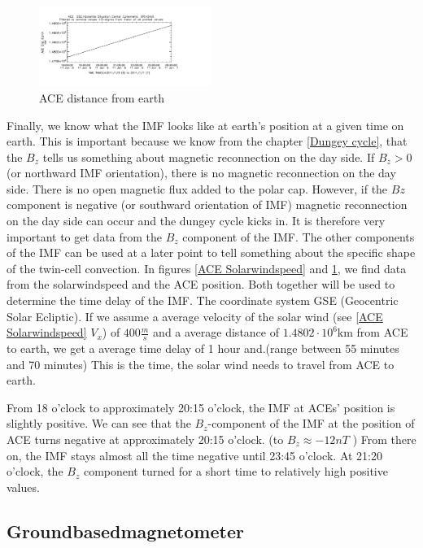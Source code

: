 \documentclass[10pt,a4paper]{article}
\begin{document}
\begin{figure}[h]
\centering
\includegraphics[width=0.5\textwidth]{ACE_distance.pdf}
\caption{ ACE distance from earth \label{ACE distance}}
\end{figure}
Finally, we know what the IMF looks like at earth's position at a given time on earth. 
This is important because we know from the chapter \ref{Dungey cycle}, that the $B_z$ tells us something about magnetic reconnection on the day side. If $B_z>0$ (or northward IMF orientation), there is no magnetic reconnection on the day side. There is no open magnetic flux added to the polar cap. 
However, if the $Bz$ component is negative (or southward orientation of IMF) magnetic reconnection on the day side can occur and the dungey cycle kicks in. 
It is therefore very important to get data from the $B_z$ component of the IMF. The other components of the IMF can be used at a later point to tell something about the specific shape of the twin-cell convection. In figures \ref{ACE Solarwindspeed} and \ref{ACE distance}, we find data from the solarwindspeed and the ACE position. Both together will be used to determine the time delay of the IMF. The coordinate system GSE (Geocentric Solar Ecliptic). If we assume a average velocity of the solar wind (see \ref{ACE Solarwindspeed} $V_x$) of $400 \frac{m}{s}$ and a average distance of $1.4802 \cdot 10^{6} \mathrm{km}$ from ACE to earth, we get a average time delay of 1 hour and.(range between 55 minutes and 70 minutes) This is the time, the solar wind needs to travel from ACE to earth. 

From 18 o'clock to approximately 20:15 o'clock, the IMF at ACEs' position is slightly positive. We can see that the $B_z$-component of the IMF at the position of ACE turns negative at approximately 20:15 o'clock. (to $B_z\approx-12 n T$ ) From there on, the IMF stays almost all the time negative until 23:45 o'clock. At 21:20 o'clock, the $B_z$ component turned for a short time to relatively high positive values.  

\clearpage
\subsection{Groundbasedmagnetometer\label{0_CHAPTER_GROUNDBASEDMag}}
\end{document}
